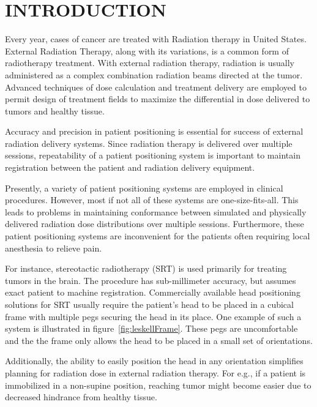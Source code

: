 
\section{INTRODUCTION}
\label{sec:introduction}

Every year,  cases of cancer are treated with Radiation therapy 
in United States.
External Radiation Therapy, along with its variations, is a common form
of radiotherapy treatment. With external radiation therapy, radiation is usually 
administered as a complex combination radiation beams directed at the tumor. 
Advanced techniques of dose 
calculation and treatment delivery are employed to permit design of treatment 
fields to maximize the differential in dose delivered to tumors and healthy 
tissue.

Accuracy and precision in patient positioning is essential for success of 
external radiation delivery systems. Since radiation therapy is delivered over 
multiple sessions, repeatability of a patient positioning system is important 
to maintain registration between the patient and radiation delivery equipment.

Presently, a variety of patient positioning  systems are employed in clinical 
procedures. However, most if not all of these systems are one-size-fits-all. 
This leads to problems in maintaining conformance between
simulated and physically delivered radiation dose distributions over multiple 
sessions. Furthermore, these patient positioning systems are inconvenient 
for the patients often requiring local anesthesia to relieve pain.

For instance, stereotactic radiotherapy (SRT) is used primarily for treating 
tumors in the brain. The procedure has sub-millimeter accuracy, but assumes 
exact patient to machine registration. Commercially available head positioning 
solutions for SRT usually require the patient's head to be placed in a cubical 
frame with multiple pegs securing the head in its place. One example of such
a system is illustrated in figure~\ref{fig:leskellFrame}. These pegs are 
uncomfortable and the the frame only allows the head to be placed in a 
small set of orientations.

Additionally, the ability to easily position the head in any orientation simplifies
planning for radiation dose in external radiation therapy. For e.g., if a patient 
is immobilized in a non-supine position, reaching tumor might become easier 
due to decreased hindrance from healthy tissue. 



